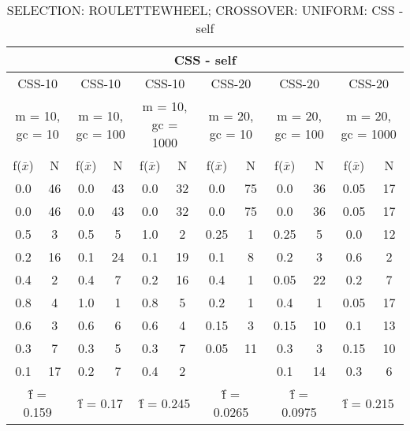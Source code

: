 \begin{table}[H]
	\centering
	\caption{SELECTION: ROULETTEWHEEL; CROSSOVER: UNIFORM: CSS - self}
	\begin{adjustbox}{width=1\textwidth}
		\begin{tabular}{ |c|c||c|c||c|c||c|c||c|c||c|c| }
			\hline
			\multicolumn{12}{|c|}{CSS - self} \\
			\hline
			\multicolumn{2}{|c||}{CSS-10} & \multicolumn{2}{c||}{CSS-10} & \multicolumn{2}{c||}{CSS-10} & \multicolumn{2}{c||}{CSS-20} & \multicolumn{2}{c||}{CSS-20} & \multicolumn{2}{c|}{CSS-20}\\
			\hline
			\multicolumn{2}{|c||}{m = 10, gc = 10} & \multicolumn{2}{c||}{m = 10, gc = 100} & \multicolumn{2}{c||}{m = 10, gc = 1000} & \multicolumn{2}{c||}{m = 20, gc = 10} & \multicolumn{2}{c||}{m = 20, gc = 100} & \multicolumn{2}{c|}{m = 20, gc = 1000}\\
			\hline
			f($\bar{x}$) & N & f($\bar{x}$) & N & f($\bar{x}$) & N & f($\bar{x}$) & N & f($\bar{x}$) & N & f($\bar{x}$) & N\\
			\hline
			\hline
			0.0 & 46 & 0.0 & 43 & 0.0 & 32 & 0.0 & 75 & 0.0 & 36 & 0.05 & 17\\
			\hline
			0.0 & 46 & 0.0 & 43 & 0.0 & 32 & 0.0 & 75 & 0.0 & 36 & 0.05 & 17\\
			0.5 & 3 & 0.5 & 5 & 1.0 & 2 & 0.25 & 1 & 0.25 & 5 & 0.0 & 12\\
			0.2 & 16 & 0.1 & 24 & 0.1 & 19 & 0.1 & 8 & 0.2 & 3 & 0.6 & 2\\
			0.4 & 2 & 0.4 & 7 & 0.2 & 16 & 0.4 & 1 & 0.05 & 22 & 0.2 & 7\\
			0.8 & 4 & 1.0 & 1 & 0.8 & 5 & 0.2 & 1 & 0.4 & 1 & 0.05 & 17\\
			0.6 & 3 & 0.6 & 6 & 0.6 & 4 & 0.15 & 3 & 0.15 & 10 & 0.1 & 13\\
			0.3 & 7 & 0.3 & 5 & 0.3 & 7 & 0.05 & 11 & 0.3 & 3 & 0.15 & 10\\
			0.1 & 17 & 0.2 & 7 & 0.4 & 2 &   &   & 0.1 & 14 & 0.3 & 6\\
			\hline
			\multicolumn{2}{|c||}{\^{f} = 0.159} & \multicolumn{2}{c||}{\^{f} = 0.17} & \multicolumn{2}{c||}{\^{f} = 0.245} & \multicolumn{2}{c||}{\^{f} = 0.0265} & \multicolumn{2}{c||}{\^{f} = 0.0975} & \multicolumn{2}{c|}{\^{f} = 0.215}\\
			\hline
		\end{tabular}
	\end{adjustbox}
\end{table}
